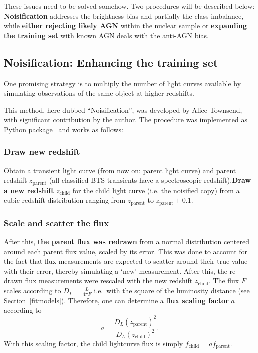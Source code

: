 These issues need to be solved somehow. Two procedures will be described below: \textbf{Noisification} addresses the brightness bias and partially the class imbalance, while \textbf{either rejecting likely AGN} within the nuclear sample or \textbf{expanding the training set} with known AGN deals with the anti-AGN bias.

\subsection{Noisification: Enhancing the training set}
One promising strategy is to multiply the number of light curves available by simulating observations of the same object at higher redshifts.

This method, here dubbed ``Noisification'', was developed by Alice Townsend, with significant contribution by the author. The procedure was implemented as Python package~ and works as follows:

\subsubsection{Draw new redshift}
Obtain a transient light curve (from now on: parent light curve) and parent redshift $z_\text{parent}$ (all classified BTS transients have a spectroscopic redshift).\textbf{Draw a new redshift} $z_\text{child}$ for the child light curve (i.e. the noisified copy) from a cubic redshift distribution ranging from $z­_\text{parent}$ to $z_\text{parent}+0.1$.

\subsubsection{Scale and scatter the flux}
After this, \textbf{the parent flux was redrawn} from a normal distribution centered around each parent flux value, scaled by its error. This was done to account for the fact that flux measurements are expected to scatter around their true value with their error, thereby simulating a `new' measurement. After this, the re-drawn flux measurements were rescaled with the new redshift $z_\text{child}$. The flux $F$ scales according to $D_L=\frac{L}{4 \pi F}$ i.e.~with the square of the luminosity distance (see Section~\ref{fitmodels}). Therefore, one can determine a \textbf{flux scaling factor} $a$ according to
\begin{equation}
    a = \frac{D_L(z_\text{parent})^2}{D_L(z_\text{child})^2}.
\end{equation}
With this scaling factor, the child lightcurve flux is simply $f_\text{child} = a f_\text{parent}$.

